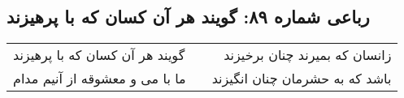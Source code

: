 \begin{center}
\section*{رباعی شماره ۸۹: گویند هر آن کسان که با پرهیزند}
\label{sec:sh089}
\begin{longtable}{l p{0.5cm} r}
گویند هر آن کسان که با پرهیزند
&&
زانسان که بمیرند چنان برخیزند
\\
ما با می و معشوقه از آنیم مدام
&&
باشد که به حشرمان چنان انگیزند
\\
\end{longtable}
\end{center}
